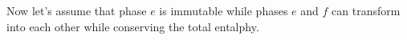 Now let's assume that phase \(e\) is immutable while phases \(e\) and \(f\) can transform into each other while conserving the total entalphy.